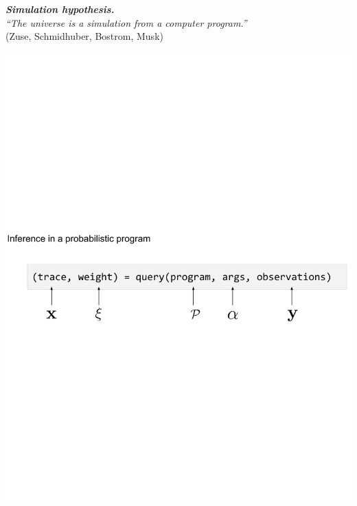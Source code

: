 \documentclass[10pt,
               xcolor={usenames,dvipsnames},
               hyperref={colorlinks,linktoc=all,citecolor=Plum,linkcolor=MidnightBlue,urlcolor=MidnightBlue},noamssymb]{beamer}
\begin{document}
\begin{frame}
\begin{center}
{\Huge
\textit{\textbf{Simulation hypothesis.} \\
``The universe is a simulation from a computer program.''
}
\\[2ex]
{\Large
(Zuse, Schmidhuber, Bostrom, Musk)
}}
\end{center}
\end{frame}

\begin{frame}
\vspace{-20ex}
\begin{center}
\includegraphics[width=1.0\textwidth]{img/query.pdf}
\end{center}
\end{frame}
\end{document}
